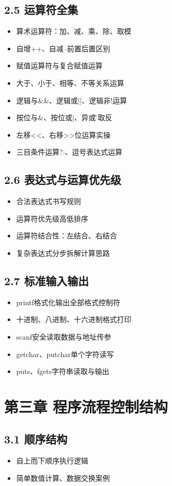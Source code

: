 \subsection{2.5 运算符全集}
\begin{itemize}
\item 算术运算符：加、减、乘、除、取模
\item 自增++、自减--前置后置区别
\item 赋值运算符与复合赋值运算
\item 大于、小于、相等、不等关系运算
\item 逻辑与\&\&、逻辑或||、逻辑非!运算
\item 按位与\&、按位或|、异或\^、取反~
\item 左移<<、右移>>位运算实操
\item 三目条件运算?:、逗号表达式运算
\end{itemize}

\subsection{2.6 表达式与运算优先级}
\begin{itemize}
\item 合法表达式书写规则
\item 运算符优先级高低排序
\item 运算符结合性：左结合、右结合
\item 复杂表达式分步拆解计算思路
\end{itemize}

\subsection{2.7 标准输入输出}
\begin{itemize}
\item printf格式化输出全部格式控制符
\item 十进制、八进制、十六进制格式打印
\item scanf安全读取数据与地址传参
\item getchar、putchar单个字符读写
\item puts、fgets字符串读取与输出
\end{itemize}

\section{第三章 程序流程控制结构}
\subsection{3.1 顺序结构}
\begin{itemize}
\item 自上而下顺序执行逻辑
\item 简单数值计算、数据交换案例
\end{itemize}

